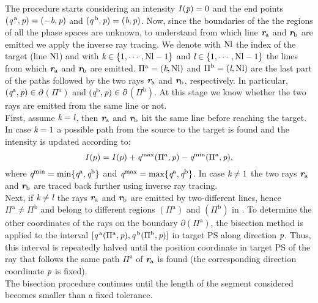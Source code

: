 The procedure starts considering an intensity $I(\textit{p})=0$ and the end points $(\textit{q}^{\,\textrm{a}}, \textit{p})= (-\textit{b}, \textit{p})$ and $(\textit{q}^{\,\textrm{b}}, \textit{p}) = (\textit{b}, \textit{p})$. Now, since the boundaries of the the regions of all the phase spaces are unknown, to understand from which line $\textit{\textbf{r}}_{\textrm{a}}$ and $\textit{\textbf{r}}_{\textrm{b}}$ are emitted we apply the inverse ray tracing. We denote with $\textrm{Nl}$ the index of the target (line $\textrm{Nl}$) and with $\textit{k}\in\{1,\cdots, \textrm{Nl}-1\}$ and $\textit{l}\in\{1,\cdots, \textrm{Nl}-1\}$ the lines from which $\textit{\textbf{r}}_{\textrm{a}}$ and $\textit{\textbf{r}}_{\textrm{b}}$ are emitted. $\Pi^\textrm{a} = (\textit{k}, \textrm{Nl})$ and $\Pi^\textrm{b} = (\textit{l},\textrm{Nl})$ are the last part of the paths followed by the two rays $\textit{\textbf{r}}_{\textrm{a}}$ and $\textit{\textbf{r}}_{\textrm{b}}$, respectively. In particular, $(\textit{q}^{\textrm{a}}, \textit{p})\in\partial$$(\Pi^{\textrm{a}})$ and $(\textit{q}^{\textrm{b}}, \textit{p})\in\partial$$(\Pi^{\textrm{b}})$. At this stage we know whether the two rays are emitted from the same line or not. \\ \indent 
First, assume $\textit{k}= \textit{l}$, then $\textit{\textbf{r}}_{\textrm{a}}$ and $\textit{\textbf{r}}_{\textrm{b}}$ hit the same line before reaching the target. 
In case $\textit{k} = 1$ a possible path from the source to the target is found and the intensity is updated according to:
\begin{equation}
I(p) = I(p)+\textit{q}^{\textrm{max}}(\Pi^\textrm{a}, \textit{p})-\textit{q}^{\textrm{min}}(\Pi^\textrm{a}, \textit{p}),
\end{equation}
where $\textit{q}^{\textrm{min}} = \min\{\textit{q}^{\textrm{a}}, \textit{q}^{\textrm{b}}\}$ and $\textit{q}^{\textrm{max}} = \max\{\textit{q}^{\textrm{a}}, \textit{q}^{\textrm{b}}\}$. In case $\textit{k}\neq1$ the two rays $\textit{\textbf{r}}_{\textrm{a}}$ and $\textit{\textbf{r}}_{\textrm{b}}$ are traced back further using inverse ray tracing.
\\ \indent Next, if $\textit{k}\neq \textit{l}$ the rays $\textit{\textbf{r}}_\textrm{a}$ and $\textit{\textbf{r}}_\textrm{b}$ are emitted by two-different lines, hence $\Pi^{\textrm{a}}\neq \Pi^{\textrm{b}}$ and belong to different regions $(\Pi^{\textrm{a}})$ and $(\Pi^{\textrm{b}})$ in . To determine the other coordinates of the rays on the boundary $\partial$$(\Pi^{\textrm{a}})$, the bisection method is applied to the interval $[\textit{q}^{\,\textrm{a}}(\Pi^{\textrm{a}}, \textit{p}), \textit{q}^{\,\textrm{b}}(\Pi^{\textrm{b}}, \textit{p})]$ in target PS  along direction $\textit{p}$. Thus, this interval is repeatedly halved until the position coordinate in target PS of the ray that follows the same path $\Pi^{\textrm{a}}$ of $\textit{\textbf{r}}_{\textrm{a}}$ is found (the corresponding direction coordinate $\textit{p}$ is fixed). \\ \indent The bisection procedure continues until the length of the segment considered becomes smaller than a fixed tolerance. 
